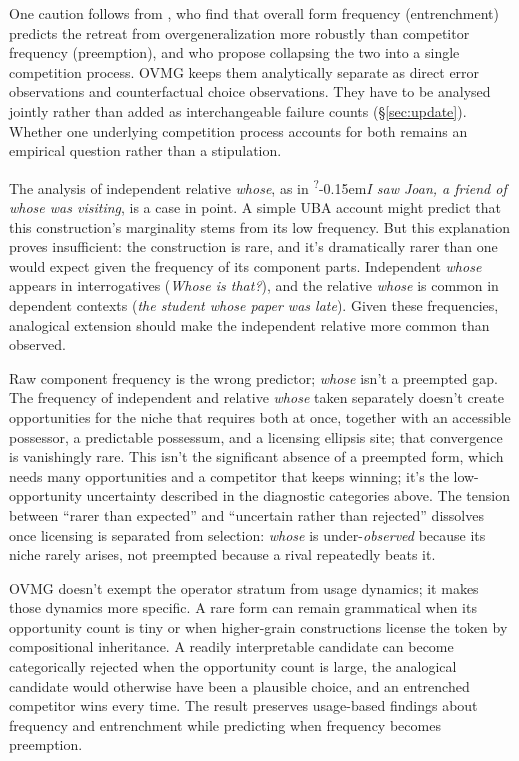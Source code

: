 \documentclass[12pt,letterpaper]{article}
\newcommand{\mention}[1]{\textit{#1}}
\newcommand{\judgesep}{\kern-0.15em}
\newcommand{\marg}[1]{\textsuperscript{?}\judgesep#1}
\begin{document}
One caution follows from \textcite{AmbridgeEtAl2015}, who find that overall form
frequency (entrenchment) predicts the retreat from overgeneralization more
robustly than competitor frequency (preemption), and who propose collapsing the
two into a single competition process. OVMG keeps them analytically
separate as direct error observations and counterfactual choice observations.
They have to be analysed jointly rather than added as interchangeable failure
counts (\S\ref{sec:update}). Whether one underlying competition process accounts
for both remains an empirical question rather than a stipulation.

The analysis of independent relative \mention{whose}, as in \marg{\mention{I saw Joan, a friend of whose was visiting}}, is a case in point. A simple UBA account might predict that this construction's marginality stems from its low frequency. But this explanation proves insufficient: the construction is rare, and it's dramatically rarer than one would expect given the frequency of its component parts. Independent \mention{whose} appears in interrogatives (\mention{Whose is that?}), and the relative \mention{whose} is common in dependent contexts (\mention{the student whose paper was late}). Given these frequencies, analogical extension should make the independent relative more common than observed.

Raw component frequency is the wrong predictor; \mention{whose} isn't a
preempted gap. The frequency of independent and relative \mention{whose} taken
separately doesn't create opportunities for the niche that requires both at
once, together with an accessible possessor, a predictable possessum, and a
licensing ellipsis site; that convergence is vanishingly rare. This isn't the
significant absence of a preempted form, which needs many opportunities and
a competitor that keeps winning; it's the low-opportunity uncertainty described
in the diagnostic categories above. The tension between \enquote{rarer than
expected} and \enquote{uncertain rather than rejected} dissolves once licensing
is separated from selection: \mention{whose} is under-\emph{observed} because
its niche rarely arises, not preempted because a rival repeatedly beats it.

OVMG doesn't exempt the operator stratum from usage dynamics; it makes those
dynamics more specific. A rare form can remain grammatical when its opportunity
count is tiny or when higher-grain constructions license the token by
compositional inheritance. A readily interpretable candidate can become
categorically rejected when the opportunity count is large, the analogical
candidate would otherwise have been a plausible choice, and an entrenched
competitor wins every time. The result preserves usage-based findings about
frequency and entrenchment while predicting when frequency becomes preemption.
\end{document}

